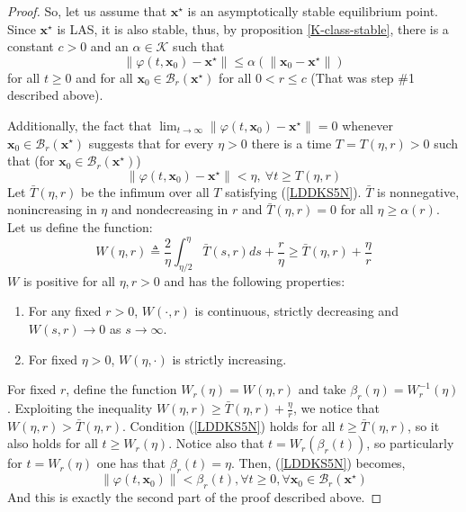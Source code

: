 \documentclass[a4paper,10pt,oneside]{book}
\begin{document}
\begin{proof}
So, let us assume that $\mathbf{x}^\star$ is an asymptotically stable equilibrium point.
Since $\mathbf{x}^\star$ is LAS, it is also stable, thus, by proposition \ref{K-class-stable},
there is a constant $c>0$ and an $\alpha\in\mathcal{K}$ such that
\begin{equation}
 \|\varphi(t,\mathbf{x}_0)-\mathbf{x}^\star\| \leq \alpha(\|\mathbf{x}_0-\mathbf{x}^\star\|)
\end{equation}
for all $t\geq 0$ and for all $\mathbf{x}_0\in\mathcal{B}_r(\mathbf{x}^\star)$ for all $0<r\leq c$
(That was step \#1 described above).

Additionally, the fact that $\lim_{t\to\infty}\|\varphi(t,\mathbf{x}_0)-\mathbf{x}^\star\|=0$
whenever $\mathbf{x}_0\in\mathcal{B}_r(\mathbf{x}^\star)$
suggests that for every $\eta>0$ there is a time $T=T(\eta,r)>0$ such that 
(for $\mathbf{x}_0\in\mathcal{B}_r(\mathbf{x}^\star)$)
\begin{equation}\label{LDDKS5N}
 \|\varphi(t,\mathbf{x}_0)-\mathbf{x}^\star\|<\eta,\ \forall t\geq T(\eta,r)
\end{equation}
Let $\bar{T}(\eta,r)$ be the infimum over all $T$ satisfying (\ref{LDDKS5N}). $\bar{T}$ 
is nonnegative, nonincreasing in $\eta$ and nondecreasing in $r$ and $\bar{T}(\eta,r)=0$ for all
$\eta\geq\alpha(r)$. Let us define the function:
\begin{equation}
 W(\eta,r)\triangleq \frac{2}{\eta}\int_{\eta/2}^\eta\bar{T}(s,r)ds+\frac{r}{\eta} \geq \bar{T}(\eta,r)+\frac{\eta}{r}
\end{equation}
$W$  is positive for all $\eta,r>0$ and has the following properties:
\begin{enumerate}
 \item For any fixed $r>0$, $W(\cdot,r)$ is continuous, strictly decreasing and $W(s,r)\to0$ as $s\to \infty$.
 \item For fixed $\eta>0$, $W(\eta,\cdot)$ is strictly increasing.
\end{enumerate}
For fixed $r$, define the function $W_r(\eta)=W(\eta,r)$ and take $\beta_r(\eta)=W_r^{-1}(\eta)$.
Exploiting the inequality $W(\eta,r)\geq \bar{T}(\eta,r)+\frac{\eta}{r}$, we notice that $W(\eta,r)> \bar{T}(\eta,r)$.
Condition (\ref{LDDKS5N}) holds for all $t\geq \bar{T}(\eta,r)$, so it also holds for all $t\geq W_r(\eta)$.
Notice also that $t=W_r(\beta_r(t))$, so particularly for $t=W_r(\eta)$ one has that $\beta_r(t)=\eta$.
Then, (\ref{LDDKS5N}) becomes,
\begin{equation}
 \|\varphi(t,\mathbf{x}_0)\|<\beta_r(t),\forall t\geq  0,\forall \mathbf{x}_0\in\mathcal{B}_r(\mathbf{x}^\star)
\end{equation}
And this is exactly the second part of the proof described above.
\end{proof}
%
%
%
\end{document}
